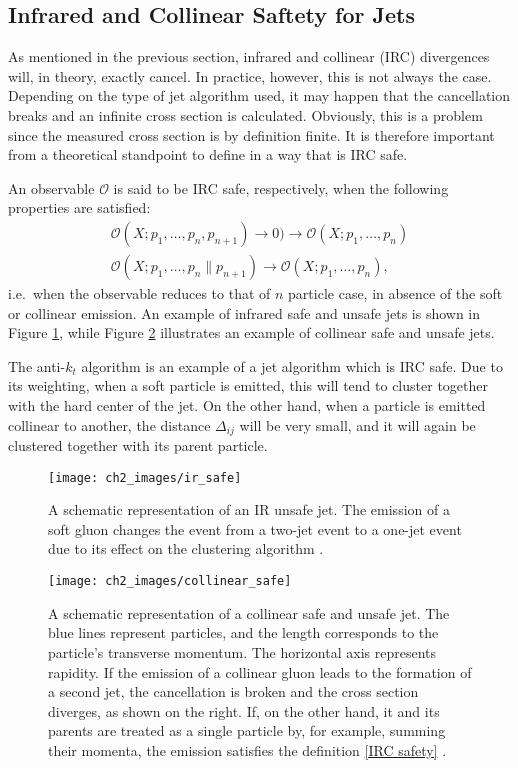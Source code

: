 \documentclass[10pt,a4paper]{book}
\begin{document}
\subsection{Infrared and Collinear Saftety for Jets}
As mentioned in the previous section, infrared and collinear (IRC) divergences will, in theory, exactly cancel. In practice, however, this is not always the case. Depending on the type of jet algorithm used, it may happen that the cancellation breaks and an infinite cross section is calculated. Obviously, this is a problem since the measured cross section is by definition finite. It is therefore important from a theoretical standpoint to define in a way that is IRC safe. 

An observable $\mathcal{O}$ is said to be IRC safe, respectively, when the following properties are satisfied:
\begin{gather}
\mathcal{O}(X; p_1, \dots, p_n, p_{n+1}) \rightarrow 0) \rightarrow  \mathcal{O}(X; p_1, \dots, p_n ) \label{IRC safety}\\
\mathcal{O}(X; p_1, \dots, p_n \parallel p_{n+1}) \rightarrow \mathcal{O}(X; p_1, \dots, p_n),
\end{gather}
i.e.\ when the observable reduces to that of $n$ particle case, in absence of the soft or collinear emission. An example of infrared safe and unsafe jets is shown in Figure \ref{Infrared safe jet}, while Figure \ref{collinear safe jet} illustrates an example of collinear safe and unsafe jets.

The anti-$k_t$ algorithm is an example of a jet algorithm which is IRC safe. Due to its weighting, when a soft particle is emitted, this will tend to cluster together with the hard center of the jet. On the other hand, when a particle is emitted collinear to another, the distance $\Delta_{ij}$ will be very small, and it will again be clustered together with its parent particle.


\begin{figure}
\centering
\texttt{[image: ch2\_images/ir\_safe]}
\caption{A schematic representation of an IR unsafe jet. The emission of a soft gluon changes the event from a two-jet event to a one-jet event due to its effect on the clustering algorithm \cite{Salam:2010nqg}.}
\label{Infrared safe jet}
\end{figure}

\begin{figure}
\centering
\texttt{[image: ch2\_images/collinear\_safe]}
\caption{A schematic representation of a collinear safe and unsafe jet. The blue lines represent particles, and the length corresponds to the particle's transverse momentum. The horizontal axis represents rapidity. If the emission of a collinear gluon leads to the formation of a second jet, the cancellation is broken and the cross section diverges, as shown on the right. If, on the other hand, it and its parents are treated as a single particle by, for example, summing their momenta, the emission satisfies the definition \ref{IRC safety} \cite{Salam:2010nqg}.}
\label{collinear safe jet}
\end{figure}
\end{document}

